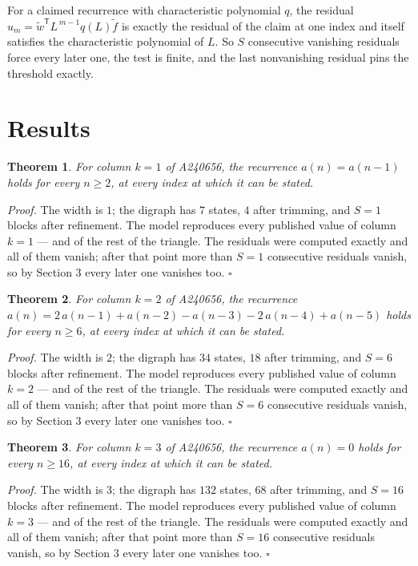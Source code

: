 \documentclass[11pt]{article}
\newtheorem{theorem}{Theorem}
\theoremstyle{definition}
\begin{document}
For a claimed recurrence with characteristic polynomial $q$, the residual $u_m = \tilde w^{\mathsf T}L^{\,m-1}q(L)\tilde f$ is exactly the residual of the claim at one index and itself satisfies the characteristic polynomial of $L$. So $S$ consecutive vanishing residuals force every later one, the test is finite, and the last nonvanishing residual pins the threshold exactly.

\section{Results}

\begin{theorem} For column $k = 1$ of A240656, the recurrence $a(n) = a(n-1)$ holds for every $n \ge 2$, at every index at which it can be stated.\end{theorem}

{\itshape Proof.} The width is $1$; the digraph has $7$ states, $4$ after trimming, and $S = 1$ blocks after refinement. The model reproduces every published value of column $k = 1$ --- and of the rest of the triangle. The residuals were computed exactly and all of them vanish; after that point more than $S = 1$ consecutive residuals vanish, so by Section 3 every later one vanishes too. $\square$

\begin{theorem} For column $k = 2$ of A240656, the recurrence $a(n) = 2\,a(n-1) + a(n-2) - a(n-3) - 2\,a(n-4) + a(n-5)$ holds for every $n \ge 6$, at every index at which it can be stated.\end{theorem}

{\itshape Proof.} The width is $2$; the digraph has $34$ states, $18$ after trimming, and $S = 6$ blocks after refinement. The model reproduces every published value of column $k = 2$ --- and of the rest of the triangle. The residuals were computed exactly and all of them vanish; after that point more than $S = 6$ consecutive residuals vanish, so by Section 3 every later one vanishes too. $\square$

\begin{theorem} For column $k = 3$ of A240656, the recurrence $a(n) = 0$ holds for every $n \ge 16$, at every index at which it can be stated.\end{theorem}

{\itshape Proof.} The width is $3$; the digraph has $132$ states, $68$ after trimming, and $S = 16$ blocks after refinement. The model reproduces every published value of column $k = 3$ --- and of the rest of the triangle. The residuals were computed exactly and all of them vanish; after that point more than $S = 16$ consecutive residuals vanish, so by Section 3 every later one vanishes too. $\square$
\end{document}

